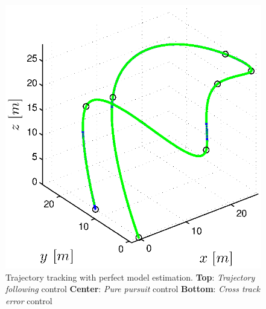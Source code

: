 \begin{figure}[H]
\begin{minipage}[t]{0.32\textwidth}
    \includegraphics[width = \textwidth]{trackings/figure_3D_agile_SplineDegree3_crossTrack_Disturbance_0}
  \end{minipage}
  \caption{Trajectory tracking with perfect model estimation. {\bf Top}: \textit{Trajectory following} control {\bf Center}: \textit{Pure pursuit} control {\bf Bottom}: \textit{Cross track error} control}
  \label{fig:results_perfect_model}
\end{figure}

